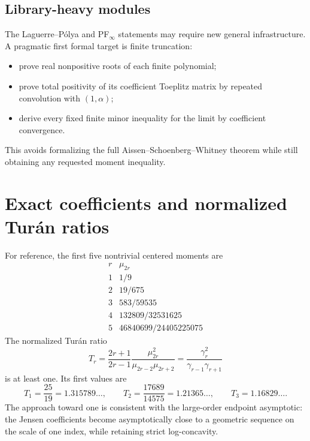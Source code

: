 \documentclass[11pt]{article}
\numberwithin{equation}{section}
\theoremstyle{definition}
\theoremstyle{remark}
\begin{document}
\subsection{Library-heavy modules}

The Laguerre--P\'olya and PF$_\infty$ statements may require new general
infrastructure.  A pragmatic first formal target is finite truncation:
\begin{itemize}
\item prove real nonpositive roots of each finite polynomial;
\item prove total positivity of its coefficient Toeplitz matrix by repeated
      convolution with $(1,\alpha)$;
\item derive every fixed finite minor inequality for the limit by coefficient
      convergence.
\end{itemize}
This avoids formalizing the full Aissen--Schoenberg--Whitney theorem while
still obtaining any requested moment inequality.

\appendix
\renewcommand*{\theHsection}{\arabic{part}.\arabic{section}}

\section{Exact coefficients and normalized Tur\'an ratios}

For reference, the first five nontrivial centered moments are
\begin{equation}\label{p5:eq:moment-table-display}
\begin{array}{c|c}
 r&\mu_{2r}\\
\hline
1&1/9\\
2&19/675\\
3&583/59535\\
4&132809/32531625\\
5&46840699/24405225075
\end{array}
\end{equation}
The normalized Tur\'an ratio
\begin{equation}\label{p5:eq:Turan-ratio}
 T_r=\frac{2r+1}{2r-1}
 \frac{\mu_{2r}^2}{\mu_{2r-2}\mu_{2r+2}}
 =\frac{\gamma_r^2}{\gamma_{r-1}\gamma_{r+1}}
\end{equation}
is at least one.  Its first values are
\begin{equation}\label{p5:eq:Turan-values}
 T_1=\frac{25}{19}=1.315789\ldots,
 \qquad
 T_2=\frac{17689}{14575}=1.21365\ldots,
 \qquad
 T_3=1.16829\ldots.
\end{equation}
The approach toward one is consistent with the large-order endpoint
asymptotic: the Jensen coefficients become asymptotically close to a geometric
sequence on the scale of one index, while retaining strict log-concavity.
\end{document}
